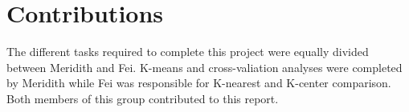 \documentclass[]{article}
\begin{document}
\section{Contributions}\label{contributions}

The different tasks required to complete this project were equally
divided between Meridith and Fei. K-means and cross-valiation analyses
were completed by Meridith while Fei was responsible for K-nearest and
K-center comparison. Both members of this group contributed to this
report.
\end{document}

